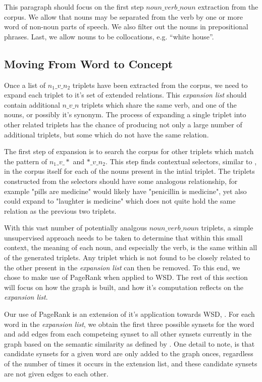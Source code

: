 \documentclass[11pt]{article}
\begin{document}
This paragraph should focus on the first step $noun\_verb\_noun$ extraction from the corpus.
We allow that nouns may be separated from the verb by one or more word of
non-noun parts of speech.  We also filter out the nouns in prepositional
phrases.  Last, we allow nouns to be collocations, e.g. ``white house''.

\subsection{Moving From Word to Concept}

Once a list of $n_1\_v\_n_2$ triplets have been extracted from the corpus, we need to
expand each triplet to it's set of extended relations.  This \emph{expansion
list} should contain additional $n\_v\_n$ triplets which share the same verb,
and one of the nouns, or possibly it's synonym.  The process of expanding a
single triplet into other related triplets has the chance of producing not only
a large number of additional triplets, but some which do not have the same
relation.  

The first step of expansion is to search the corpus for other triplets which match
the pattern of $n_1\_v\_*$ and $*\_v\_n_2$.  This step finds contextual
selectors, similar to \cite{schwartz08selectors}, in the corpus itself for each of
the nouns present in the intial triplet.  The triplets constructed from the
selectors should have some analogous relationship, for example "pills are 
medicine" would likely have "penicillin is medicine", yet also could expand to
"laughter is medicine" which does not quite hold the same relation as the
previous two triplets.  

With this vast number of potentially analgous $noun\_verb\_noun$ triplets, a
simple unsupervised approach needs to be taken to determine that within this
small context, the meaning of each noun, and especially the verb, is the same
within all of the generated triplets.  Any triplet which is not found to be
closely related to the other present in the \emph{expansion list} can then be
removed.  To this end, we chose to make use of PageRank when applied to
WSD.  The rest of this section will focus on how the graph is built, and how
it's computation reflects on the \emph{expansion list}.

Our use of PageRank is an extension of it's application towards WSD,
\cite{mihalcea04wsdpagerank,mihalcea06randomwalks}.  For each word in
the \emph{expansion list}, we obtain the first three possible synsets for the word and
add edges from each competeing synset to all other synsets currently in the
graph based on the semantic similarity as defined by
\cite{banerjee03extendedgloss}.  One detail to note, is that candidate synsets
for a given word are only added to the graph onces, regardless of the number of
times it occurs in the extension list, and these candidate synsets are not
given edges to each other. 
\end{document}
